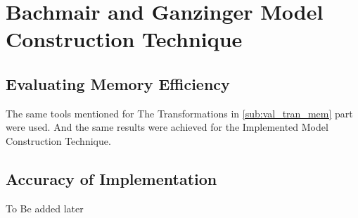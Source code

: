 \section{Bachmair and Ganzinger Model Construction Technique}
\subsection{Evaluating Memory Efficiency}
The same tools mentioned for The Transformations in \ref{sub:val_tran_mem} part were used. And the same results were achieved for the Implemented Model Construction Technique.

\subsection{Accuracy of Implementation}
To Be added later 